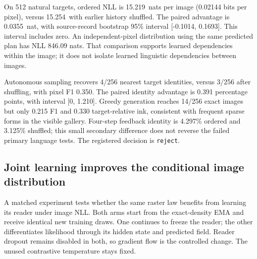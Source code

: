 \documentclass[12pt,a4paper]{article}
\newcommand{\DensityNll}{15.219}
\newcommand{\DensityShuffledNll}{15.254}
\newcommand{\DensityAdvantage}{0.0355}
\newcommand{\DensityLow}{-0.1014}
\newcommand{\DensityHigh}{0.1693}
\newcommand{\DensityFone}{0.350}
\newcommand{\DensityDecision}{reject}
\begin{document}
On 512 natural targets, ordered NLL is \DensityNll\ nats per image
(0.02144 bits per pixel), versus \DensityShuffledNll\ with earlier history
shuffled. The paired advantage is \DensityAdvantage\ nat, with source-record
bootstrap 95\% interval [\DensityLow, \DensityHigh]. This interval includes
zero. An independent-pixel distribution using the same predicted plan has NLL
846.09 nats. That comparison supports learned dependencies within the image;
it does not isolate learned linguistic dependencies between images.

Autonomous sampling recovers 4/256 nearest target identities, versus 3/256
after shuffling, with pixel F1 \DensityFone. The paired identity advantage is
0.391 percentage points, with interval [0, 1.210]. Greedy generation reaches
14/256 exact images but only 0.215 F1 and 0.330 target-relative ink, consistent
with frequent sparse forms in the visible gallery. Four-step feedback identity
is 4.297\% ordered and 3.125\% shuffled; this small secondary difference does
not reverse the failed primary language tests. The registered decision is
\texttt{\DensityDecision}.


\subsection*{Joint learning improves the conditional image distribution}
A matched experiment tests whether the same raster law benefits from learning
its reader under image NLL. Both arms start from the exact-density EMA and
receive identical new training draws. One continues to freeze the reader;
the other differentiates likelihood through its hidden state and predicted
field. Reader dropout remains disabled in both, so gradient flow is the
controlled change. The unused contrastive temperature stays fixed.
\end{document}
